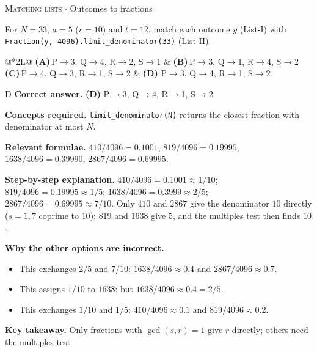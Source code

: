\documentclass[11pt,a4paper]{article}
\newcommand{\optlabel}[1]{\textbf{(#1)}}
\newcommand{\correctlabel}[1]{\textcolor{okgreen}{\textbf{(#1)}\,\ding{51}}}
\newenvironment{qitem}[1]{\begin{list}{}{\setlength{\leftmargin}{3.3em}\setlength{\labelwidth}{3.1em}%
  \setlength{\labelsep}{0.2em}\setlength{\topsep}{3pt}\setlength{\parsep}{3pt}}\item[\textbf{Q.#1}\hfill]}{\end{list}}
\newcommand{\qmeta}[2]{{\footnotesize\color{black!60}\textsc{#1} \;$\cdot$\; #2}\par}
\begin{document}
\begin{qitem}{56}
\qmeta{Matching lists}{Outcomes to fractions}
For $N = 33$, $a = 5$ ($r = 10$) and $t = 12$, match each outcome $y$ (List-I) with \texttt{Fraction(y, 4096).limit\_denominator(33)} (List-II).
\par\smallskip{}
\par\smallskip\noindent\begin{tabularx}{\linewidth}{@{}*{2}{L}@{}}
\optlabel{A}\,P$\to$3, Q$\to$4, R$\to$2, S$\to$1 & \optlabel{B}\,P$\to$3, Q$\to$1, R$\to$4, S$\to$2 \\[3pt]
\optlabel{C}\,P$\to$4, Q$\to$3, R$\to$1, S$\to$2 & \correctlabel{D}\,P$\to$3, Q$\to$4, R$\to$1, S$\to$2
\end{tabularx}
\end{qitem}
\begin{solbox}{D}
\textbf{\color{brand}Correct answer.} \textcolor{okgreen}{\textbf{(D)}} P$\to$3, Q$\to$4, R$\to$1, S$\to$2

\textbf{\color{brand}Concepts required.} \texttt{limit\_denominator(N)} returns the closest fraction with denominator at most $N$.

\textbf{\color{brand}Relevant formulae.} $410/4096 = 0.1001$, $819/4096 = 0.19995$, $1638/4096 = 0.39990$, $2867/4096 = 0.69995$.

\textbf{\color{brand}Step-by-step explanation.} $410/4096 = 0.1001 \approx 1/10$; $819/4096 = 0.19995 \approx 1/5$; $1638/4096 = 0.3999 \approx 2/5$; $2867/4096 = 0.69995 \approx 7/10$. Only $410$ and $2867$ give the
denominator $10$ directly ($s = 1, 7$ coprime to $10$); $819$ and $1638$ give $5$, and the multiples test then finds $10$.

\textbf{\color{brand}Why the other options are incorrect.}
\begin{itemize}[leftmargin=2.4em, itemsep=1pt, topsep=2pt]
\item[\textbf{(A)}] This exchanges $2/5$ and $7/10$: $1638/4096 \approx 0.4$ and $2867/4096 \approx 0.7$.
\item[\textbf{(B)}] This assigns $1/10$ to $1638$; but $1638/4096 \approx 0.4 = 2/5$.
\item[\textbf{(C)}] This exchanges $1/10$ and $1/5$: $410/4096 \approx 0.1$ and $819/4096 \approx 0.2$.
\end{itemize}
\textbf{\color{brand}Key takeaway.} Only fractions with $\gcd(s, r) = 1$ give $r$ directly; others need the multiples test.
\end{solbox}
\end{document}
